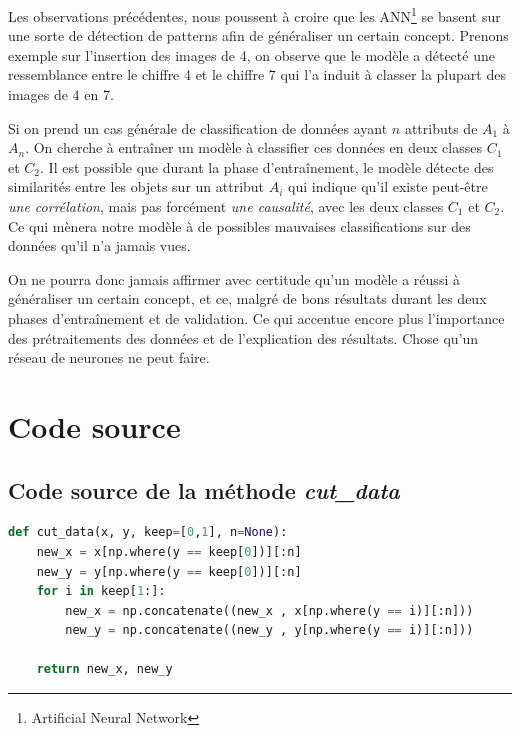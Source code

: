 \documentclass[oneside,13pt,a4paper]{report}
\begin{document}
Les observations précédentes, nous poussent à croire que les ANN\footnote{Artificial Neural Network} se basent sur une sorte de détection de patterns afin de généraliser un certain concept. Prenons exemple sur l'insertion des images de 4, on observe que le modèle a détecté une ressemblance entre le chiffre 4 et le chiffre 7 qui l'a induit à classer la plupart des images de 4 en 7.

Si on prend un cas générale de classification de données ayant $n$ attributs de $A_1$ à $A_n$. On cherche à entraîner un modèle à classifier ces données en deux classes $C_1$ et $C_2$. Il est possible que durant la phase d'entraînement, le modèle détecte des similarités entre les objets sur un attribut $A_i$ qui indique qu'il existe peut-être \textit{une corrélation}, mais pas forcément \textit{une causalité}, avec les deux classes $C_1$ et $C_2$. Ce qui mènera notre modèle à de possibles mauvaises classifications sur des données qu'il n'a jamais vues.

On ne pourra donc jamais affirmer avec certitude qu'un modèle a réussi à généraliser un certain concept, et ce, malgré de bons résultats durant les deux phases d'entraînement et de validation. Ce qui accentue encore plus l'importance des prétraitements des données et de l'explication des résultats. Chose qu'un réseau de neurones ne peut faire.


\appendix

\printbibliography

\chapter{Code source}

\section{Code source de la méthode \textit{cut\_data}}

\begin{lstlisting}[language=Python]
	def cut_data(x, y, keep=[0,1], n=None):
    new_x = x[np.where(y == keep[0])][:n]
    new_y = y[np.where(y == keep[0])][:n]
    for i in keep[1:]:
        new_x = np.concatenate((new_x , x[np.where(y == i)][:n]))
        new_y = np.concatenate((new_y , y[np.where(y == i)][:n]))

    return new_x, new_y
\end{lstlisting}
\end{document}
